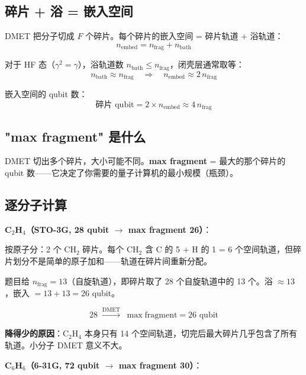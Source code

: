 \documentclass[11pt,a4paper]{article}
\begin{document}
\subsection{碎片 + 浴 = 嵌入空间}

DMET 把分子切成 $F$ 个碎片。每个碎片的嵌入空间 = 碎片轨道 + 浴轨道：
\begin{equation}
  n_{\text{embed}} = n_{\text{frag}} + n_{\text{bath}}
\end{equation}

对于 HF 态（$\gamma^2 = \gamma$），浴轨道数 $n_{\text{bath}} \leq n_{\text{frag}}$，闭壳层通常取等：
\begin{equation}
  n_{\text{bath}} \approx n_{\text{frag}} \quad\Longrightarrow\quad n_{\text{embed}} \approx 2\,n_{\text{frag}}
\end{equation}

嵌入空间的 qubit 数：
\begin{equation}
  \boxed{\;\text{碎片 qubit} = 2 \times n_{\text{embed}} \approx 4\,n_{\text{frag}}\;}
\end{equation}

\subsection{"max fragment" 是什么}

DMET 切出多个碎片，大小可能不同。\textbf{max fragment} = 最大的那个碎片的 qubit 数——它决定了你需要的量子计算机的最小规模（瓶颈）。

\subsection{逐分子计算}

\textbf{C$_2$H$_4$（STO-3G, 28 qubit $\to$ max fragment 26）}：

按原子分：2 个 CH$_2$ 碎片。每个 CH$_2$ 含 C 的 5 + H 的 1 = 6 个空间轨道，但碎片划分不是简单的原子加和——轨道在碎片间重新分配。

题目给 $n_{\text{frag}} = 13$（自旋轨道），即碎片取了 28 个自旋轨道中的 13 个。浴 $\approx 13$，嵌入 $= 13 + 13 = 26$ qubit。

\begin{equation}
  28 \;\xrightarrow{\text{DMET}}\; \max\text{fragment} = 26 \text{ qubit}
\end{equation}

\textbf{降得少的原因}：C$_2$H$_4$ 本身只有 14 个空间轨道，切完后最大碎片几乎包含了所有轨道。小分子 DMET 意义不大。

\textbf{C$_6$H$_6$（6-31G, 72 qubit $\to$ max fragment 30）}：
\end{document}
